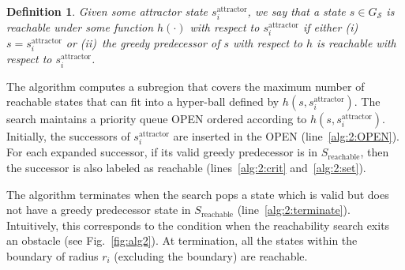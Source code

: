 \documentclass[letterpaper]{article} %
\newcommand{\calS}{\ensuremath{\mathcal{S}}\xspace}
\newcommand{\sAttract}{\ensuremath{s^{\text{attractor}}_i}\xspace}
\newtheorem{definition}{Definition}
\begin{document}
\vspace{2mm}
\begin{definition}
	Given some attractor state \sAttract, we say that a state $s \in G_\calS$ is reachable under some function $h(\cdot)$ with respect to \sAttract if either
	(i)~$s = \sAttract$ or
	(ii)~the greedy predecessor of $s$ with respect to $h$ is reachable with respect to \sAttract.
\end{definition}


The algorithm computes a subregion that covers the maximum number of reachable states that can fit into a hyper-ball defined by $h(s,\sAttract)$. 
The search maintains a priority queue OPEN ordered according to $h(s,\sAttract)$. Initially, the successors of $\sAttract$ are inserted in the OPEN (line~\ref{alg:2:OPEN}). For each expanded successor, if its valid greedy predecessor is in $S_{\text{reachable}}$, then the successor is also labeled as reachable (lines~\ref{alg:2:crit} and~\ref{alg:2:set}). 


The algorithm terminates when the search pops a state which is valid but does not have a greedy predecessor state in $S_{\text{reachable}}$ (line~\ref{alg:2:terminate}). Intuitively, this corresponds to  the condition when the reachability search exits an obstacle (see Fig.~\ref{fig:alg2}).
At termination, all the states within the boundary of radius $r_i$ (excluding the boundary) are reachable.
\end{document}
